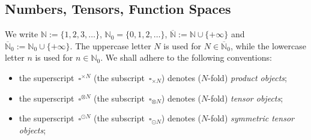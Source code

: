 \documentclass[11pt,letterpaper]{amsart}
\DeclareMathOperator{\eqdef}{\coloneqq}
\newcommand{\paren}[1]{\left(#1\right)}							%
\newcommand{\asym}[1]{{\scriptscriptstyle{[#1]}}}
\newcommand{\sym}[1]{{\scriptscriptstyle{(#1)}}}
\newcommand{\tym}[1]{{\scriptscriptstyle{\times #1}}}
\newcommand{\otym}[1]{{\scriptscriptstyle{\otimes #1}}}
\newcommand{\osym}[1]{{\scriptscriptstyle{\odot #1}}}
\newcommand{\seq}[1]{\paren{#1}}								%
\newcommand{\N}{{\mathbb N}}
\newcommand{\EN}{\overline{\N}}
\newcommand{\R}{{\mathbb R}}
\renewcommand{\1}{\mathbf 1}
\numberwithin{equation}{section}
\theoremstyle{plain}
\theoremstyle{definition}
\theoremstyle{remark}
\begin{document}
\subsection{Numbers, Tensors, Function Spaces}
We write $\N:=\{1, 2, 3, \ldots\}$, $\N_0=\{0, 1, 2, \ldots \}$, $\EN:=\N \cup \{+\infty\}$ and $\EN_0:=\N_0 \cup\{+\infty\}$. 
The uppercase letter $N$ is used for  $N \in \EN_0$, while the lowercase letter $n$ is used for $n \in \N_0$. 
We shall adhere to the following conventions:
\begin{itemize}
\item the superscript~${\square}^\tym{N}$ (the subscript~$\square_\tym{N}$) denotes ($N$-fold) \emph{product objects};

\item the superscript~${\square}^\otym{N}$ (the subscript~$\square_\otym{N}$) denotes ($N$-fold) \emph{tensor objects};

\item the superscript~${\square}^\osym{N}$ (the subscript~$\square_\osym{N}$) denotes ($N$-fold) \emph{symmetric tensor objects};



\end{itemize}
\end{document}
